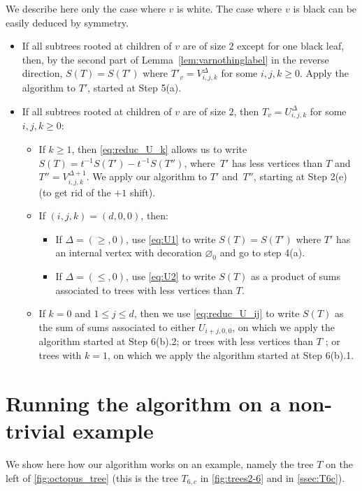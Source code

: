 \documentclass[12pt]{amsart}
\theoremstyle{plain}
\theoremstyle{remark}
\begin{document}
We describe here only the case where $v$ is white. The case where $v$ is black can be easily deduced by symmetry.
\begin{itemize}
\item[6(a)] If all subtrees rooted at children of $v$ are of size $2$ except for one black leaf, then, by the second part of Lemma~\ref{lem:varnothinglabel} in the reverse direction, $S(T)=S(T')$ where $T'_v=V^{\Delta}_{i,j,k}$ for some $i,j,k \geq 0$. Apply the algorithm to $T'$, started at Step 5(a).
\item[6(b)] If all subtrees rooted at children of $v$ are of size $2$, then $T_v=U_{i,j,k}^{\Delta}$ for some $i,j,k \geq 0$:
\begin{itemize}
\item[6(b).1] If $k \geq 1$, then \eqref{eq:reduc_U_k} allows us to write $S(T)=t^{-1}S(T')-t^{-1}S(T'')$, where~$T'$ has less vertices than $T$ and $T''=V_{i,j,k}^{\Delta+1}$. 
We apply our algorithm to $T'$ and~$T''$, starting at Step 2(e) (to get rid of the $+1$ shift).
\item[6(b).2] If $(i,j,k)=(d,0,0)$, then:
\begin{itemize}
\item If $\Delta=(\geq,0)$, use \eqref{eq:U1} to write $S(T)=S(T')$ where $T'$ has an internal vertex with decoration $\varnothing_0$ and go to step 4(a).
\item If $\Delta=(\leq,0)$, use \eqref{eq:U2} to write $S(T)$ as a product of sums associated to trees with less vertices than $T$.
\end{itemize}
\item[6(b).3] If $k=0$ and $1 \leq j \leq d$, then we use \eqref{eq:reduc_U_ij} to write $S(T)$ as the sum of sums associated to either $U_{i+j,0,0}$, on which we apply the algorithm started at Step 6(b).2; or trees with less vertices than $T$ ; or trees with $k=1$, on which we apply the algorithm started at Step 6(b).1.
\end{itemize} 
\end{itemize}

\section{Running the algorithm on a non-trivial example}
\label{appendix:running_algo}

We show here how our algorithm works on an example, namely the tree $T$ on the left of \cref{fig:octopus_tree} (this is the tree $T_{6,c}$ in \cref{fig:trees2-6} and in \cref{ssec:T6c}).
\end{document}

